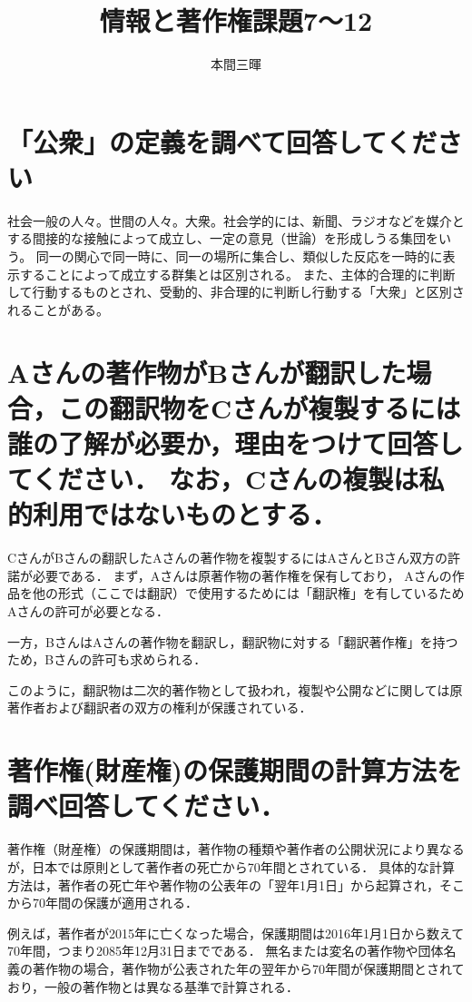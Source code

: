 \documentclass[titlepage,a4paper]{jsarticle}
\title{情報と著作権課題7〜12}
\author{本間三暉}
\begin{document}
\maketitle
\section{「公衆」の定義を調べて回答してください}
社会一般の人々。世間の人々。大衆。社会学的には、新聞、ラジオなどを媒介とする間接的な接触によって成立し、一定の意見（世論）を形成しうる集団をいう。
同一の関心で同一時に、同一の場所に集合し、類似した反応を一時的に表示することによって成立する群集とは区別される。
また、主体的合理的に判断して行動するものとされ、受動的、非合理的に判断し行動する「大衆」と区別されることがある。\cite{kousyuu}
\section{Aさんの著作物がBさんが翻訳した場合，この翻訳物をCさんが複製するには誰の了解が必要か，理由をつけて回答してください．
  なお，Cさんの複製は私的利用ではないものとする．}
CさんがBさんの翻訳したAさんの著作物を複製するにはAさんとBさん双方の許諾が必要である．
まず，Aさんは原著作物の著作権を保有しており，
Aさんの作品を他の形式（ここでは翻訳）で使用するためには「翻訳権」を有しているためAさんの許可が必要となる\cite{TMJ}\cite{27}．

一方，BさんはAさんの著作物を翻訳し，翻訳物に対する「翻訳著作権」を持つため，Bさんの許可も求められる\cite{OCiETe}．

このように，翻訳物は二次的著作物として扱われ，複製や公開などに関しては原著作者および翻訳者の双方の権利が保護されている\cite{JOHO}．

\section{著作権(財産権)の保護期間の計算方法を調べ回答してください．}
著作権（財産権）の保護期間は，著作物の種類や著作者の公開状況により異なるが，日本では原則として著作者の死亡から70年間とされている．
具体的な計算方法は，著作者の死亡年や著作物の公表年の「翌年1月1日」から起算され，そこから70年間の保護が適用される\cite{neta}\cite{qa}．

例えば，著作者が2015年に亡くなった場合，保護期間は2016年1月1日から数えて70年間，つまり2085年12月31日までである\cite{NAKAGAKI}．
無名または変名の著作物や団体名義の著作物の場合，著作物が公表された年の翌年から70年間が保護期間とされており，一般の著作物とは異なる基準で計算される\cite{q2}．
\end{document}
